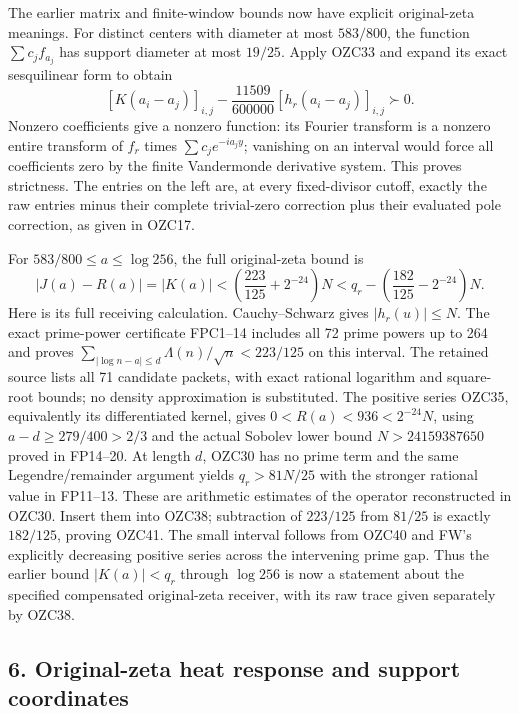 \documentclass[
  10pt,
  a4paper,
]{article}
\begin{document}
The earlier matrix and finite-window bounds now have explicit
original-zeta meanings. For distinct centers with diameter at most
\(583/800\), the function \(\sum c_jf_{a_j}\) has support diameter at
most \(19/25\). Apply OZC33 and expand its exact sesquilinear form to
obtain \[
\left[K(a_i-a_j)\right]_{i,j}
-\frac{11509}{600000}\left[h_r(a_i-a_j)\right]_{i,j}\succ0.
\tag{OZC40}
\] Nonzero coefficients give a nonzero function: its Fourier transform
is a nonzero entire transform of \(f_r\) times \(\sum c_je^{-ia_jy}\);
vanishing on an interval would force all coefficients zero by the finite
Vandermonde derivative system. This proves strictness. The entries on
the left are, at every fixed-divisor cutoff, exactly the raw entries
minus their complete trivial-zero correction plus their evaluated pole
correction, as given in OZC17.

For \(583/800\le a\le\log256\), the full original-zeta bound is \[
|J(a)-R(a)|=|K(a)|
<\left(\frac{223}{125}+2^{-24}\right)N
<q_r-\left(\frac{182}{125}-2^{-24}\right)N.
\tag{OZC41}
\] Here is its full receiving calculation. Cauchy--Schwarz gives
\(|h_r(u)|\le N\). The exact prime-power certificate FPC1--14 includes
all 72 prime powers up to 264 and proves
\(\sum_{|\log n-a|\le d}\Lambda(n)/\sqrt n<223/125\) on this interval.
The retained source lists all 71 candidate packets, with exact rational
logarithm and square-root bounds; no density approximation is
substituted. The positive series OZC35, equivalently its differentiated
kernel, gives \(0<R(a)<936<2^{-24}N\), using \(a-d\ge279/400>2/3\) and
the actual Sobolev lower bound \(N>24159387650\) proved in FP14--20. At
length \(d\), OZC30 has no prime term and the same Legendre/remainder
argument yields \(q_r>81N/25\) with the stronger rational value in
FP11--13. These are arithmetic estimates of the operator reconstructed
in OZC30. Insert them into OZC38; subtraction of \(223/125\) from
\(81/25\) is exactly \(182/125\), proving OZC41. The small interval
follows from OZC40 and FW's explicitly decreasing positive series across
the intervening prime gap. Thus the earlier bound \(|K(a)|<q_r\) through
\(\log256\) is now a statement about the specified compensated
original-zeta receiver, with its raw trace given separately by OZC38.

\subsection{6. Original-zeta heat response and support
coordinates}\label{original-zeta-heat-response-and-support-coordinates}
\end{document}
